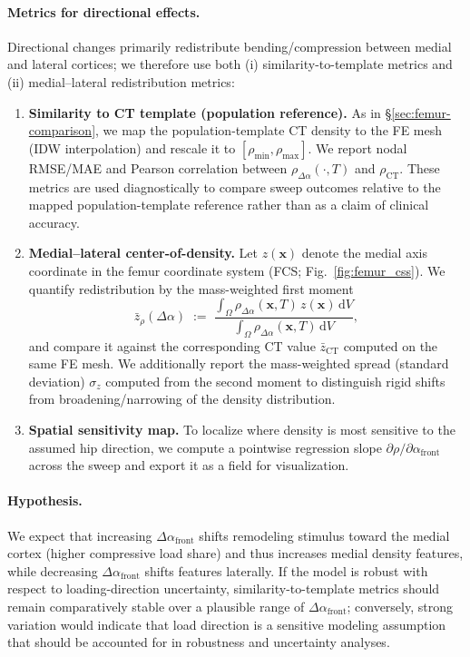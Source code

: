 \paragraph{Metrics for directional effects.}
Directional changes primarily redistribute bending/compression between medial and lateral cortices; we therefore use both (i) similarity-to-template metrics and (ii) medial--lateral redistribution metrics:
\begin{enumerate}
  \item \textbf{Similarity to CT template (population reference).}
  As in \S\ref{sec:femur-comparison}, we map the population-template CT density to the FE mesh (IDW interpolation) and rescale it to $[\rho_{\min},\rho_{\max}]$.
  We report nodal RMSE/MAE and Pearson correlation between $\rho_{\Delta\alpha}(\cdot,T)$ and $\rho_{\mathrm{CT}}$.
  These metrics are used diagnostically to compare sweep outcomes relative to the mapped population-template reference rather than as a claim of clinical accuracy.
  \item \textbf{Medial--lateral center-of-density.}
  Let $z(\mathbf{x})$ denote the medial axis coordinate in the femur coordinate system (FCS; Fig.~\ref{fig:femur_css}).
  We quantify redistribution by the mass-weighted first moment
  \[
  \bar z_{\rho}(\Delta\alpha)\;:=\;\frac{\int_\Omega \rho_{\Delta\alpha}(\mathbf{x},T)\,z(\mathbf{x})\,\mathrm{d}V}{\int_\Omega \rho_{\Delta\alpha}(\mathbf{x},T)\,\mathrm{d}V},
  \]
  and compare it against the corresponding CT value $\bar z_{\mathrm{CT}}$ computed on the same FE mesh.
  We additionally report the mass-weighted spread (standard deviation) $\sigma_z$ computed from the second moment to distinguish rigid shifts from broadening/narrowing of the density distribution.
  \item \textbf{Spatial sensitivity map.}
  To localize where density is most sensitive to the assumed hip direction, we compute a pointwise regression slope $\partial\rho/\partial\alpha_{\mathrm{front}}$ across the sweep and export it as a field for visualization.
\end{enumerate}

\paragraph{Hypothesis.}
We expect that increasing $\Delta\alpha_{\mathrm{front}}$ shifts remodeling stimulus toward the medial cortex (higher compressive load share) and thus increases medial density features, while decreasing $\Delta\alpha_{\mathrm{front}}$ shifts features laterally.
If the model is robust with respect to loading-direction uncertainty, similarity-to-template metrics should remain comparatively stable over a plausible range of $\Delta\alpha_{\mathrm{front}}$; conversely, strong variation would indicate that load direction is a sensitive modeling assumption that should be accounted for in robustness and uncertainty analyses.

